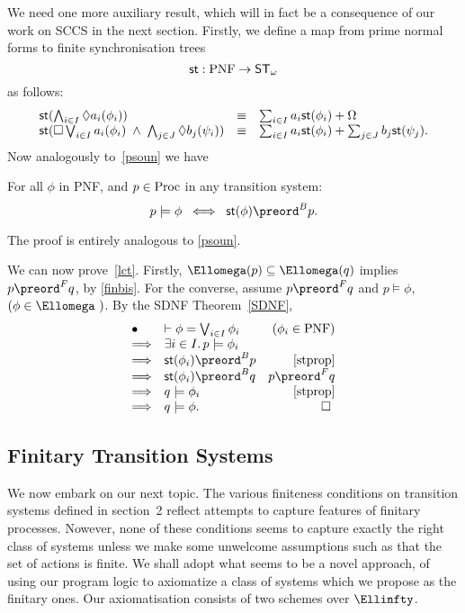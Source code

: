 We need one more auxiliary result, which will in fact be a consequence of our work on SCCS in the next section.
Firstly, we define a map from prime normal forms to finite synchronisation trees
\[ {\sf st} : \mbox{PNF} \rightarrow {\sf ST}_{\omega} \]
as follows:
\[ \begin{array}{lll}
{\sf st}( \bigwedge_{i \in I} \Diamond a_{i}(\phi_{i})) & \equiv & {\sum_{i \in I} a_{i} {\sf st}(\phi_{i}) } + \Omega \\
{\sf st}( \Box \bigvee_{i \in I} a_{i}(\phi_{i}) \; \wedge \; \bigwedge_{j \in J} \Diamond b_{j}(\psi_{i})) & \equiv & {\sum_{i \in I} a_{i} {\sf st}(\phi_{i}) } + { \sum_{j \in J} b_{j} {\sf st}(\psi_{j}) }  .
\end{array} \]
Now analogously to~\ref{psoun} we have
\begin{proposition} 
\label{stprop}
For all $\phi$ in PNF, and $p \in {\rm Proc}$ in any transition system:
\[ p  \models  \phi \;\; \Longleftrightarrow \;\; {\sf st}(\phi ) \preord^{B} p . \]
\end{proposition}
The proof is entirely analogous to \ref{psoun}.

We can now prove~\ref{lct}.
Firstly, ${\Ellomega}(p) \subseteq {\Ellomega}(q)$ implies $p \preord^{F} q$, by \ref{finbis}.
For the converse, assume $p \preord^{F} q$ and $p \models \phi$, $(\phi \in \Ellomega\ )$.
By the SDNF Theorem~\ref{SDNF},
\[ \begin{array}{llr}
\bullet & \vdash \phi = \bigvee_{i \in I} \phi_{i} & (\phi_{i} \in \mbox{PNF}) \\
\Longrightarrow & \exists i \in I . \, p \models \phi_{i} & \\
\Longrightarrow & {\sf st}(\phi_{i}) \preord^{B} p & \ref{stprop} \\
\Longrightarrow & {\sf st}(\phi_{i}) \preord^{B} q & p \preord^{F} q \\
\Longrightarrow & q \models \phi_{i} & \ref{stprop} \\
\Longrightarrow & q \models \phi . & \qed\ 
\end{array} \]
\subsection*{Finitary Transition Systems}

We now embark on our next topic.
The various finiteness conditions on transition systems defined in section~2 reflect attempts to capture features of finitary processes.
Nowever, none of these conditions seems to capture exactly the right class of systems unless we make some unwelcome assumptions such as that the set of actions is finite.
We shall adopt what seems to be a novel approach, of using our program logic to axiomatize a class of systems which we propose as the finitary ones.
Our axiomatisation consists of two schemes over $\Ellinfty$.

